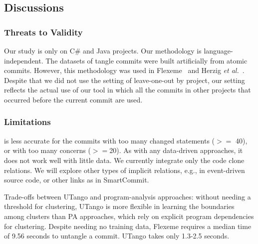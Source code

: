 \subsection{\bf Discussions}


\subsubsection{Threats to Validity}
Our study is only on C\# and Java projects. Our methodology
is language-independent. The datasets of tangle commits were built
artificially from atomic commits. However, this methodology was used in Flexeme~\cite{flexeme-fse20} and Herzig {\em et
al.}~\cite{kim-msr13}.
Despite that we did not use the setting of leave-one-out by project,
our setting reflects the actual use of our tool in which 
all the commits in other projects that occurred before the current
commit are used.



\subsubsection{Limitations}
{\tool} is less accurate for the commits with too many changed
statements ($>=$ 40), or with too many concerns ($>=$20). As with any
data-driven approaches, it does not work well with little
data. We currently integrate only the code clone
relations. We will explore other types of implicit relations, e.g., in
event-driven source code, or other links as in SmartCommit.

Trade-offs between UTango and program-analysis approaches:
without needing a threshold for clustering, UTango is more flexible in
learning the boundaries among clusters than PA approaches, which rely
on explicit program dependencies for clustering. Despite needing no
training data, Flexeme requires a median time of 9.56 seconds to
untangle a commit. UTango takes only 1.3-2.5 seconds.

